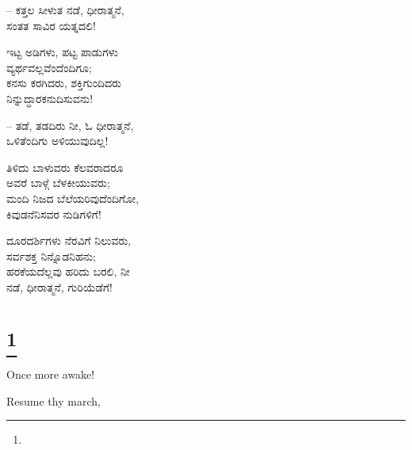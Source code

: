 \begin{flushright}
– ಕತ್ತಲ ಸೀಳುತ ನಡೆ, ಧೀರಾತ್ಮನೆ,\\ಸಂತತ ಸಾವಿರ ಯತ್ನದಲಿ!
\end{flushright}

\begin{myquote}
ಇಟ್ಟ ಅಡಿಗಳು, ಪಟ್ಟ ಪಾಡುಗಳು\\ವ್ಯರ್ಥವಲ್ಲವೆಂದೆಂದಿಗೂ;\\ಕನಸು ಕರಗಿದರು, ಶಕ್ತಿಗುಂದಿದರು\\ನಿನ್ನುದ್ಧಾರಕನುದಿಸುವನು!
\end{myquote}

\begin{flushright}
– ತಡೆ, ತಡದಿರು ನೀ, ಓ ಧೀರಾತ್ಮನೆ,\\ಒಳಿತೆಂದಿಗು ಅಳಿಯುವುದಿಲ್ಲ!
\end{flushright}

\begin{myquote}
ತಿಳಿದು ಬಾಳುವರು ಕೆಲವರಾದರೂ\\ಅವರೆ ಬಾಳ್ಗೆ ಬೆಳಕೀಯುವರು;\\ಮಂದಿ ನಿಜದ ಬೆಲೆಯರಿವುದೆಂದಿಗೋ,\\ಕಿವುಡನೆನಿಸವರ ನುಡಿಗಳಿಗೆ!
\end{myquote}

\begin{myquote}
ದೂರದರ್ಶಿಗಳು ನೆರವಿಗೆ ನಿಲುವರು,\\ಸರ್ವಶಕ್ತ ನಿನ್ನೊಡನಿಹನು;\\ಹರಕೆಯದೆಲ್ಲವು ಹರಿದು ಬರಲಿ, ನೀ\\ನಡೆ, ಧೀರಾತ್ಮನೆ, ಗುರಿಯೆಡೆಗೆ!
\end{myquote}

\selecteng

\chapter[TO THE AWAKENED INDIA]{\protect\footnote{}}

Once more awake!

\begin{myquote}
\end{myquote}

Resume thy march,

\begin{myquote}
\end{myquote}

